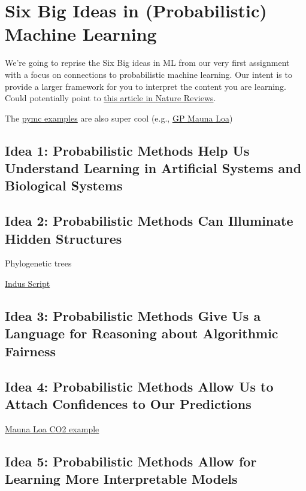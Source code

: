\documentclass[assignment01_Solutions]{subfiles}
\begin{document}
\section{Six Big Ideas in (Probabilistic) Machine Learning}
We're going to reprise the Six Big ideas in ML from our very first assignment with a focus on connections to probabilistic machine learning.  Our intent is to provide a larger framework for you to interpret the content you are learning.  Could potentially point to \href{https://www.nature.com/articles/nature14541.pdf}{this article in Nature Reviews}.


The \href{https://docs.pymc.io/nb_examples/index.html}{pymc examples} are also super cool (e.g., \href{https://docs.pymc.io/notebooks/GP-MaunaLoa.html}{GP Mauna Loa})

\subsection*{Idea 1: Probabilistic Methods Help Us Understand Learning in Artificial Systems and Biological Systems}

\subsection*{Idea 2: Probabilistic Methods Can Illuminate Hidden Structures}

\bi
\item Phylogenetic trees
\item \href{https://homes.cs.washington.edu/~rao/indus.html}{Indus Script}
\ei


\subsection*{Idea 3: Probabilistic Methods Give Us a Language for Reasoning about Algorithmic Fairness}

\subsection*{Idea 4: Probabilistic Methods Allow Us to Attach Confidences to Our Predictions}

\href{https://docs.pymc.io/notebooks/GP-MaunaLoa.html}{Mauna Loa CO2 example}

\subsection*{Idea 5: Probabilistic Methods Allow for Learning More Interpretable Models}
\end{document}
